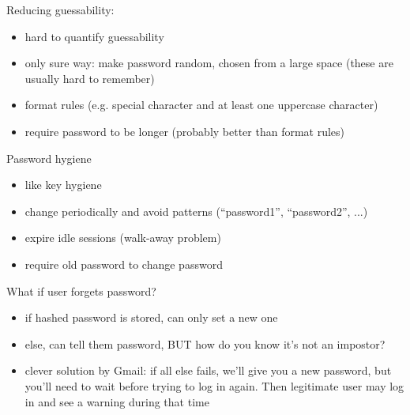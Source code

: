 
Reducing guessability:
\begin{itemize}
	\item hard to quantify guessability
	\item only sure way: make password random, chosen from a large space (these are usually hard to remember)
	\item format rules (e.g. special character and at least one uppercase character)
	\item require password to be longer (probably better than format rules)
\end{itemize}

Password hygiene
\begin{itemize}
    \item like key hygiene
    \item change periodically and avoid patterns (``password1'', ``password2'', ...)
    \item expire idle sessions (walk-away problem)
    \item require old password to change password
\end{itemize}

What if user forgets password?
\begin{itemize}
    \item if hashed password is stored, can only set a new one
    \item else, can tell them password, BUT how do you know it's not an
            impostor?
    \item clever solution by Gmail: if all else fails, we'll give you a new
            password, but you'll need to wait before trying to log in again.
            Then legitimate user may log in and see a warning during that time
\end{itemize}

